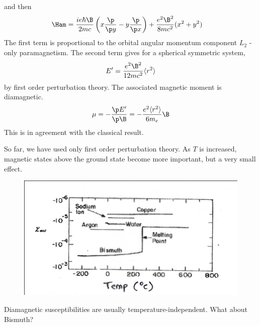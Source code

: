 \documentclass[a4paper, 11pt, normalem]{report}
\begin{document}
and then
\begin{align}
    \Ham &= \frac{ie\hbar\B}{2mc}\left(x\frac{\p}{\p y} - y\frac{\p}{\p x}\right) + \frac{e^2\B^2}{8mc^2}(x^2+y^2) 
\end{align}
The first term is proportional to the orbital angular momentum component $L_2$ - only paramagnetism. 
The second term gives for a spherical symmetric system, 
\begin{equation}
    E' = \frac{e^2\B^2}{12mc^2}\langle r^2\rangle
\end{equation}
by first order perturbation theory. 
The associated magnetic moment is diamagnetic. 
\begin{equation}
    \mu = -\frac{\p E'}{\p\B} = -\frac{e^2\langle r^2\rangle}{6m_e}\B
\end{equation}
This is in agreement with the classical result. 

So far, we have used only first order perturbation theory. 
As $T$ is increased, magnetic states above the ground state become more important, but a very small effect.
\begin{figure}[H]
    \centering
    \includegraphics[scale=0.5]{bismuth.png}
\end{figure}
Diamagnetic susceptibilities are usually temperature-independent.
What about Bismuth?
\end{document}
